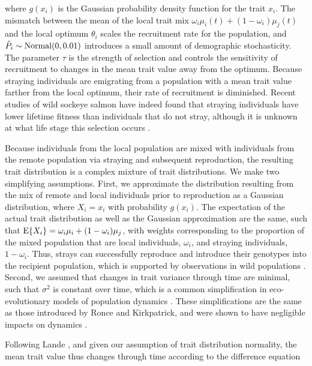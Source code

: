 \documentclass{revtex4}
\begin{document}
\noindent where $g(x_i)$ is the Gaussian probability density function for the trait $x_i$. The mismatch between the mean of the local trait mix $\omega_i\mu_i(t) + (1-\omega_i)\mu_j(t)$ and the local optimum $\theta_i$ scales the recruitment rate for the population, and $\tilde{P}_i\sim {\rm Normal}(0,0.01)$ introduces a small amount of demographic stochasticity.
The parameter $\tau$ is the strength of selection and controls the sensitivity of recruitment to changes in the mean trait value away from the optimum.
Because straying individuals are emigrating from a population with a mean trait value farther from the local optimum, their rate of recruitment is diminished.
Recent studies of wild sockeye salmon have indeed found that straying individuals have lower lifetime fitness than individuals that do not stray, although it is unknown at what life stage this selection occurs \citep{Peterson:2014gy}.


Because individuals from the local population are mixed with individuals from the remote population via straying and subsequent reproduction, the resulting trait distribution is a complex mixture of trait distributions.
We make two simplifying assumptions.
First, we approximate the distribution resulting from the mix of remote and local individuals prior to reproduction as a Gaussian distribution, where $X_i=x_i$ with probability $g(x_i)$.
The expectation of the actual trait distribution as well as the Gaussian approximation are the same, such that ${\rm E}\{X_i\} = \omega_i\mu_i + (1-\omega_i)\mu_j$, with weights corresponding to the proportion of the mixed population that are local individuals, $\omega_i$, and straying individuals, $1-\omega_i$.
Thus, strays can successfully reproduce and introduce their genotypes into the recipient population, which is supported by observations in wild populations \citep{Jasper:2013cc}.
Second, we assumed that changes in trait variance through time are minimal, such that $\sigma^2$ is constant over time, which is a common simplification in eco-evolutionary models of population dynamics \citep{Lande:1976ga,Ronce:2001dp,Schreiber:2011wx,Gilbert:2014ee,Gibert:2015kc}.
These simplifications are the same as those introduced by Ronce and Kirkpatrick, and were shown to have negligible impacts on dynamics \citep{Ronce:2001dp}.



Following Lande \citep{Lande:1976ga}, and given our assumption of trait distribution normality, the mean trait value thus changes through time according to the difference equation
\end{document}
